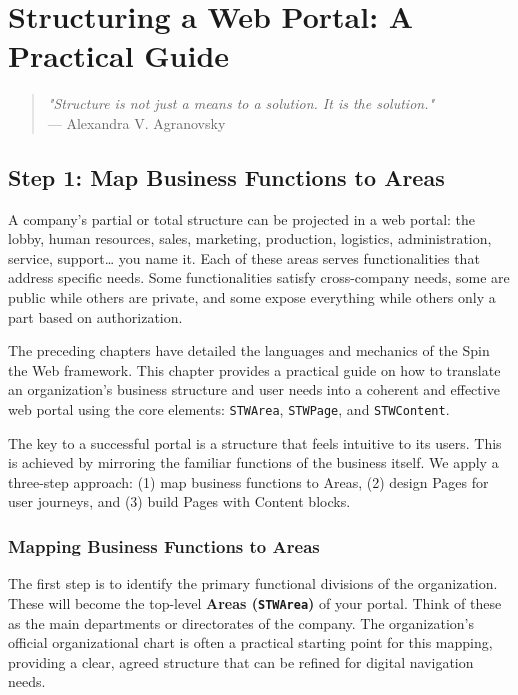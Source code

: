 \chapter{Structuring a Web Portal: A Practical Guide}
\label{chap:portal-structure}

\begin{quote}
\textit{"Structure is not just a means to a solution. It is the solution."} \\
— Alexandra V. Agranovsky
\end{quote}

\section{Step 1: Map Business Functions to Areas}
\label{sec:step1-areas}

A company's partial or total structure can be projected in a web portal: the lobby, human resources, sales, marketing, production, logistics, administration, service, support… you name it. Each of these areas serves functionalities that address specific needs. Some functionalities satisfy cross-company needs, some are public while others are private, and some expose everything while others only a part based on authorization.

The preceding chapters have detailed the languages and mechanics of the Spin the Web framework. This chapter provides a practical guide on how to translate an organization's business structure and user needs into a coherent and effective web portal using the core \wbdl{} elements: \texttt{STWArea}, \texttt{STWPage}, and \texttt{STWContent}.

The key to a successful portal is a structure that feels intuitive to its users. This is achieved by mirroring the familiar functions of the business itself. We apply a three-step approach: (1) map business functions to Areas, (2) design Pages for user journeys, and (3) build Pages with Content blocks.

\subsection{Mapping Business Functions to Areas}
The first step is to identify the primary functional divisions of the organization. These will become the top-level \textbf{Areas (\texttt{STWArea})} of your portal. Think of these as the main departments or directorates of the company. The organization's official organizational chart is often a practical starting point for this mapping, providing a clear, agreed structure that can be refined for digital navigation needs.

